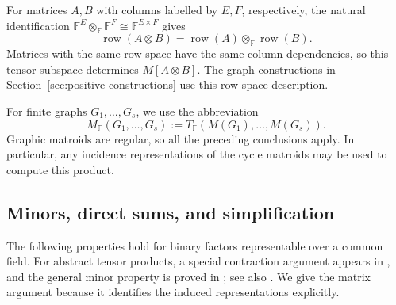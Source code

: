 \documentclass[12pt,a4paper]{article}
\numberwithin{equation}{section}
\DeclareMathOperator{\row}{row}
\newcommand{\F}{\mathbb F}
\theoremstyle{definition}
\theoremstyle{remark}
\begin{document}
For matrices \(A,B\) with columns labelled by \(E,F\), respectively,
the natural identification
\(\F^E\otimes_{\F}\F^F\cong\F^{E\times F}\) gives
\[
\row(A\otimes B)=\row(A)\otimes_{\F}\row(B).
\]
Matrices with the same row space have the same column dependencies,
so this tensor subspace determines \(M[A\otimes B]\).
The graph constructions in Section~\ref{sec:positive-constructions}
use this row-space description.

For finite graphs \(G_1,\ldots,G_s\), we use the abbreviation
\[
M_{\F}(G_1,\ldots,G_s)
 :=T_{\F}(M(G_1),\ldots,M(G_s)).
\]
Graphic matroids are regular, so all the preceding conclusions apply.
In particular, any incidence representations of the cycle matroids
may be used to compute this product.

\subsection{Minors, direct sums, and simplification}
\label{subsec:minors-direct-sums}
The following properties hold for binary factors representable over
a common field.
For abstract tensor products, a special contraction argument appears
in \cite[Remark~2.3]{las-vergnas-products}, and the general
minor property is proved in
\cite[Proposition~2.7]{anderson-matroid-products}; see also
\cite[Lemma~4.1 of the expanded version]{berczi-skew-tensor}.
We give the matrix argument because it identifies the induced
representations explicitly.
\end{document}
